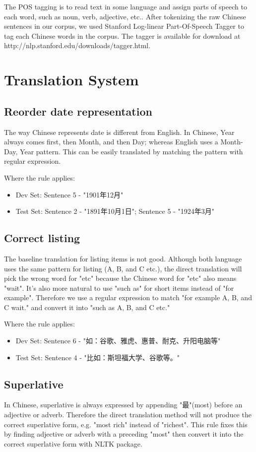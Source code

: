 \documentclass[11pt]{article} %
\begin{document}
\begin{CJK}{UTF8}{gbsn}
The POS tagging is to read text in some language and assign parts of speech to each word, such as noun, verb, adjective, etc.. After tokenizing the raw Chinese sentences in our corpus, we used Stanford Log-linear Part-Of-Speech Tagger to tag each Chinese words in the corpus. The tagger is available for download at http://nlp.stanford.edu/downloads/tagger.html.

\section{Translation System}
\subsection{Reorder date representation}
The way Chinese represents date is different from English. In Chinese, Year always comes first, then Month, and then Day; whereas English uses a Month-Day, Year pattern. This can be easily translated by matching the pattern with regular expression.

Where the rule applies:
\begin{itemize}
\item Dev Set: Sentence 5 - "1901年12月"
\item Test Set: Sentence 2 - "1891年10月1日"; Sentence 5 - "1924年3月"
\end{itemize}

\subsection{Correct listing}
The baseline translation for listing items is not good. Although both language uses the same pattern for listing (A, B, and C etc.), the direct translation will pick the wrong word for "etc" because the Chinese word for "etc" also means "wait". It's also more natural to use "such as" for short items instead of "for example". Therefore we use a regular expression to match "for example A, B, and C wait." and convert it into "such as A, B, and C etc."

Where the rule applies:
\begin{itemize}
\item Dev Set: Sentence 6 - "如：谷歌、雅虎、惠普、耐克、升阳电脑等"
\item Test Set: Sentence 4 - "比如：斯坦福大学、谷歌等。"
\end{itemize}

\subsection{Superlative}
In Chinese, superlative is always expressed by appending "最"(most) before an adjective or adverb. Therefore the direct translation method will not produce the correct superlative form, e.g. "most rich" instead of "richest". This rule fixes this by finding adjective or adverb with a preceding "most" then convert it into the correct superlative form with NLTK package.


\end{CJK}
\end{document}
